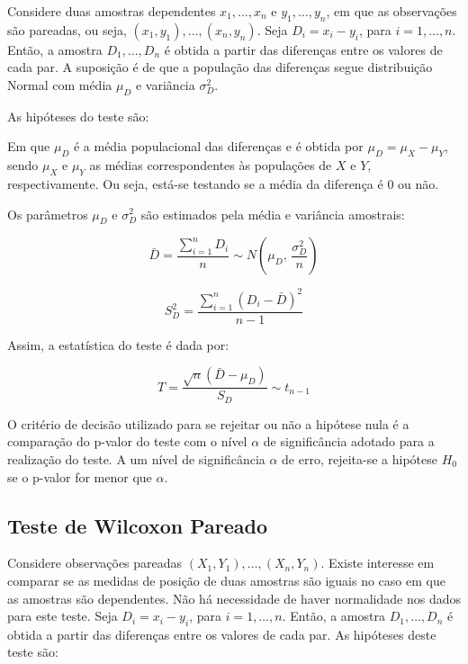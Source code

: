 \documentclass[
]{estat/estat}
\begin{document}
Considere duas amostras dependentes \(x_1, \ldots, x_n\) e
\(y_1, \ldots, y_n\), em que as observações são pareadas, ou seja,
\((x_1, y_1), \ldots, (x_n, y_n)\). Seja \(D_i = x_i - y_i\), para
\(i = 1, \ldots, n\). Então, a amostra \(D_1, \ldots, D_n\) é obtida a
partir das diferenças entre os valores de cada par. A suposição é de que
a população das diferenças segue distribuição Normal com média \(\mu_D\)
e variância \(\sigma_D^2\).

As hipóteses do teste são:


Em que \(\mu_D\) é a média populacional das diferenças e é obtida por
\(\mu_D = \mu_X - \mu_Y\), sendo \(\mu_X\) e \(\mu_Y\) as médias
correspondentes às populações de \(X\) e \(Y\), respectivamente. Ou
seja, está-se testando se a média da diferença é 0 ou não.

Os parâmetros \(\mu_D\) e \(\sigma_D^2\) são estimados pela média e
variância amostrais:

\[\bar{D} = \frac{\displaystyle \sum_{i=1}^{n} D_i}{n} \sim N\left(\mu_D, \, \frac{\sigma_D^2}{n}\right) \]

\[S_D^2 = \frac{\displaystyle \sum_{i=1}^{n}(D_i - \bar{D})^2}{n - 1}\]

Assim, a estatística do teste é dada por:

\[T = \frac{\sqrt{n} \left(\bar{D} - \mu_D\right)}{S_D} \sim t_{n - 1}\]

O critério de decisão utilizado para se rejeitar ou não a hipótese nula
é a comparação do p-valor do teste com o nível \(\alpha\) de
significância adotado para a realização do teste. A um nível de
significância \(\alpha\) de erro, rejeita-se a hipótese \(H_{0}\) se o
p-valor for menor que \(\alpha\).

\hypertarget{teste-de-wilcoxon-pareado}{%
\subsection{Teste de Wilcoxon Pareado}\label{teste-de-wilcoxon-pareado}}

Considere observações pareadas \({(X_1, Y_1), \ldots, (X_n, Y_n)}\).
Existe interesse em comparar se as medidas de posição de duas amostras
são iguais no caso em que as amostras são dependentes. Não há
necessidade de haver normalidade nos dados para este teste. Seja
\(D_i = x_i - y_i\), para \(i = 1, \ldots, n\). Então, a amostra
\(D_1, \ldots, D_n\) é obtida a partir das diferenças entre os valores
de cada par. As hipóteses deste teste são:
\end{document}
